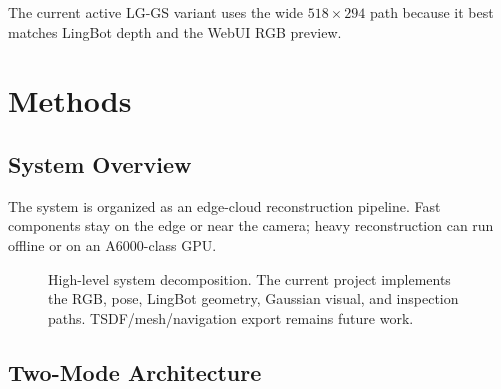 \documentclass[11pt]{article}
\newcommand{\methodabbr}{LG-GS}
\newcommand{\RouteB}{\methodabbr\xspace}
\begin{document}
The current active \RouteB variant uses the wide \(518 \times 294\) path because it best matches LingBot depth and the WebUI RGB preview.

\section{Methods}

\subsection{System Overview}

The system is organized as an edge-cloud reconstruction pipeline. Fast components stay on the edge or near the camera; heavy reconstruction can run offline or on an A6000-class GPU.

\begin{figure}[H]
\centering
{}
\caption{High-level system decomposition. The current project implements the RGB, pose, LingBot geometry, Gaussian visual, and inspection paths. TSDF/mesh/navigation export remains future work.}
\label{fig:system}
\end{figure}

\subsection{Two-Mode Architecture}
\end{document}
